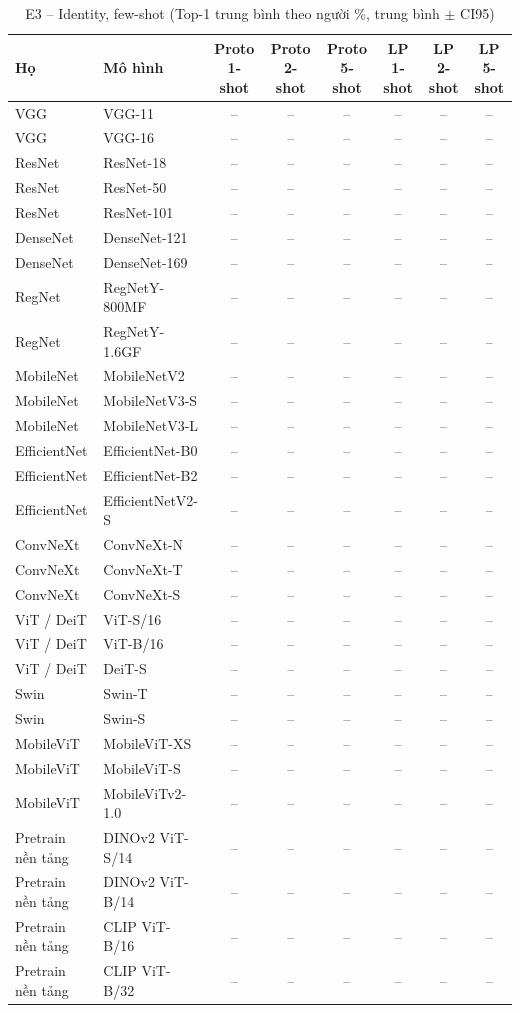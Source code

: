 \begin{table}[t]
\centering
\small
\caption{E3 – Identity, few-shot (Top-1 trung bình theo người \%, trung bình $\pm$ CI95)}
\begin{tabular}{llcccccc}
\toprule
Họ & Mô hình & Proto 1-shot & Proto 2-shot & Proto 5-shot & LP 1-shot & LP 2-shot & LP 5-shot \\
\midrule
VGG & VGG-11 & – & – & – & – & – & – \\
VGG & VGG-16 & – & – & – & – & – & – \\
ResNet & ResNet-18 & – & – & – & – & – & – \\
ResNet & ResNet-50 & – & – & – & – & – & – \\
ResNet & ResNet-101 & – & – & – & – & – & – \\
DenseNet & DenseNet-121 & – & – & – & – & – & – \\
DenseNet & DenseNet-169 & – & – & – & – & – & – \\
RegNet & RegNetY-800MF & – & – & – & – & – & – \\
RegNet & RegNetY-1.6GF & – & – & – & – & – & – \\
MobileNet & MobileNetV2 & – & – & – & – & – & – \\
MobileNet & MobileNetV3-S & – & – & – & – & – & – \\
MobileNet & MobileNetV3-L & – & – & – & – & – & – \\
EfficientNet & EfficientNet-B0 & – & – & – & – & – & – \\
EfficientNet & EfficientNet-B2 & – & – & – & – & – & – \\
EfficientNet & EfficientNetV2-S & – & – & – & – & – & – \\
ConvNeXt & ConvNeXt-N & – & – & – & – & – & – \\
ConvNeXt & ConvNeXt-T & – & – & – & – & – & – \\
ConvNeXt & ConvNeXt-S & – & – & – & – & – & – \\
ViT / DeiT & ViT-S/16 & – & – & – & – & – & – \\
ViT / DeiT & ViT-B/16 & – & – & – & – & – & – \\
ViT / DeiT & DeiT-S & – & – & – & – & – & – \\
Swin & Swin-T & – & – & – & – & – & – \\
Swin & Swin-S & – & – & – & – & – & – \\
MobileViT & MobileViT-XS & – & – & – & – & – & – \\
MobileViT & MobileViT-S & – & – & – & – & – & – \\
MobileViT & MobileViTv2-1.0 & – & – & – & – & – & – \\
Pretrain nền tảng & DINOv2 ViT-S/14 & – & – & – & – & – & – \\
Pretrain nền tảng & DINOv2 ViT-B/14 & – & – & – & – & – & – \\
Pretrain nền tảng & CLIP ViT-B/16 & – & – & – & – & – & – \\
Pretrain nền tảng & CLIP ViT-B/32 & – & – & – & – & – & – \\
\bottomrule
\end{tabular}
\end{table}
